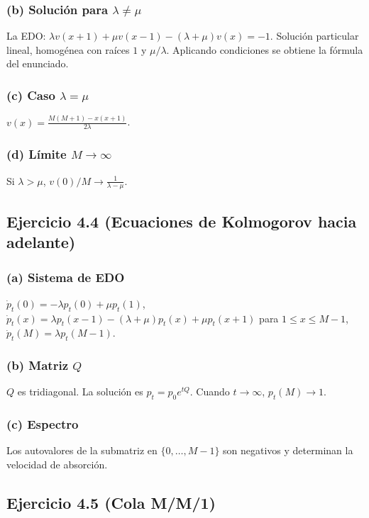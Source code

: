 \documentclass[12pt]{article}
\newcommand{\1}{\mathbf{1}}
\begin{document}
\subsubsection*{(b) Soluci\'on para $\lambda\neq\mu$}
La EDO: $\lambda v(x+1)+\mu v(x-1)-(\lambda+\mu)v(x)=-1$. Soluci\'on particular lineal, homog\'enea con ra\'ices $1$ y $\mu/\lambda$. Aplicando condiciones se obtiene la f\'ormula del enunciado.

\subsubsection*{(c) Caso $\lambda=\mu$}
$v(x)=\frac{M(M+1)-x(x+1)}{2\lambda}$.

\subsubsection*{(d) L\'imite $M\to\infty$}
Si $\lambda>\mu$, $v(0)/M\to\frac{1}{\lambda-\mu}$.

\subsection{Ejercicio 4.4 (Ecuaciones de Kolmogorov hacia adelante)}

\subsubsection*{(a) Sistema de EDO}
$\dot{p}_t(0)=-\lambda p_t(0)+\mu p_t(1)$, $\dot{p}_t(x)=\lambda p_t(x-1)-(\lambda+\mu)p_t(x)+\mu p_t(x+1)$ para $1\le x\le M-1$, $\dot{p}_t(M)=\lambda p_t(M-1)$.

\subsubsection*{(b) Matriz $Q$}
$Q$ es tridiagonal. La soluci\'on es $p_t=p_0 e^{tQ}$. Cuando $t\to\infty$, $p_t(M)\to1$.

\subsubsection*{(c) Espectro}
Los autovalores de la submatriz en $\{0,\dots,M-1\}$ son negativos y determinan la velocidad de absorci\'on.

\subsection{Ejercicio 4.5 (Cola M/M/1)}
\end{document}
